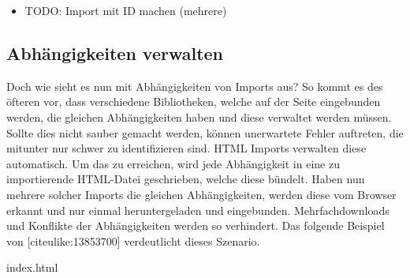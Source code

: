 \begin{Shaded}
\begin{Highlighting}[]
  \KeywordTok{>}
     \OperatorTok{=} \NormalTok{(}\OperatorTok{;}
     \OperatorTok{=} \NormalTok{(}\NormalTok{)}\OperatorTok{;}
    \NormalTok{(}\NormalTok{(}\NormalTok{))}\OperatorTok{;}
  \OperatorTok{<}
\OperatorTok{>}
\end{Highlighting}
\end{Shaded}

\begin{itemize}
\tightlist
\item
  TODO: Import mit ID machen (mehrere)
\end{itemize}

\subsection{Abhängigkeiten verwalten}\label{abhuxe4ngigkeiten-verwalten}

Doch wie sieht es nun mit Abhängigkeiten von Imports aus? So kommt es
des öfteren vor, dass verschiedene Bibliotheken, welche auf der Seite
eingebunden werden, die gleichen Abhängigkeiten haben und diese
verwaltet werden müssen. Sollte dies nicht sauber gemacht werden, können
unerwartete Fehler auftreten, die mitunter nur schwer zu identifizieren
sind. HTML Imports verwalten diese automatisch. Um das zu erreichen,
wird jede Abhängigkeit in eine zu importierende HTML-Datei geschrieben,
welche diese bündelt. Haben nun mehrere solcher Imports die gleichen
Abhängigkeiten, werden diese vom Browser erkannt und nur einmal
heruntergeladen und eingebunden. Mehrfachdownloads und Konflikte der
Abhängigkeiten werden so verhindert. Das folgende Beispiel von
{[}citeulike:13853700{]} verdeutlicht dieses Szenario.

index.html

\begin{Shaded}
\begin{Highlighting}[]
\KeywordTok{>}
\KeywordTok{>}
\end{Highlighting}
\end{Shaded}

